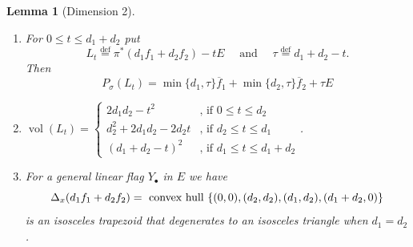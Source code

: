 \documentclass[12pt]{amsart}
\newtheorem{lemma}{Lemma}[section]
\theoremstyle{definition}
\renewcommand{\leq}{\leqslant}
\DeclareMathOperator{\vol}{vol}
\newcommand{\deq}{\ensuremath{\stackrel{\textrm{def}}{=}}}
\newcommand{\inob}[2]{\ensuremath{{\Delta}_{#1}(#2)}}
\newcommand{\?}{ \circled{{\large\bf ?}}}
\begin{document}
\begin{lemma}[Dimension 2]
\begin{enumerate}
		\item For $0\leq t\leq d_1+d_2$ put 
		\[L_t\deq\pi^*(d_1f_1+d_2f_2)-tE\quad\text{ and }\quad\tau\deq d_1+d_2-t.\] Then  
		\[P_{\sigma}(L_t)=\min\{d_1,\tau\}\overline f_1+\min\{d_2,\tau\}\overline f_2+\tau E\] 
		\smallskip
		
		\item $\vol(L_t)=\begin{cases}2d_1d_2-t^2&\text{, if } 0\leq t\leq d_2\\ d_2^2+2d_1d_2-2d_2t&\text{, if }d_2\leq t\leq d_1\\
			(d_1+d_2-t)^2&\text{, if }d_1\leq t\leq d_1+d_2\end{cases}$. 
		\smallskip
		
		\item For a general linear flag $Y_{\bullet}$ in $E$ we have 
		\[
		\inob{x}{d_1f_1+d_2f_2}=\textup{ convex hull }\{(0,0),(d_2,d_2),(d_1,d_2),(d_1+d_2,0)\}
		\]
		is an isosceles trapezoid that degenerates to an isosceles triangle when $d_1=d_2$. 
	\end{enumerate}
\end{lemma}
\end{document}
